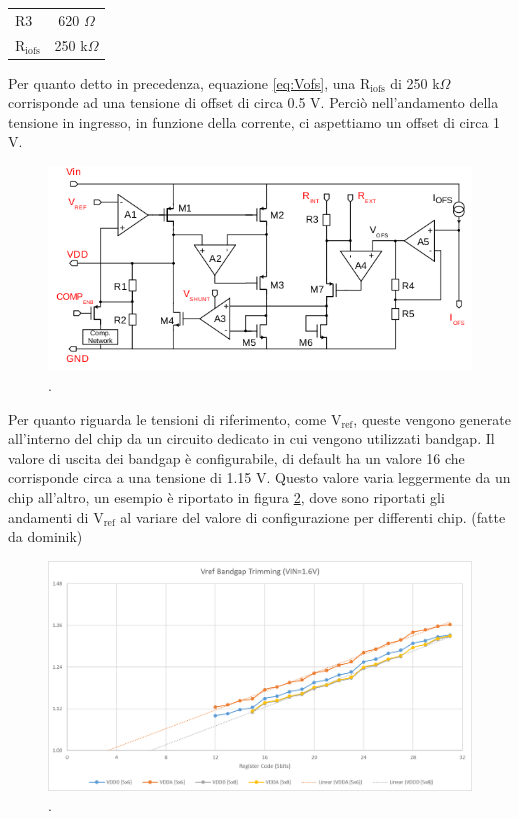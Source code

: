 \begin{center}
\begin{tabular}{lc}
\hline
$\mathrm{R3}$ & 620 $\Omega$ \\
$\mathrm{R_{iofs}}$ & 250 k$\Omega$\\ 
\hline
\end{tabular}
\end{center}
Per quanto detto in precedenza, equazione \ref{eq:Vofs}, una $\mathrm{R_{iofs}}$ di 250 k$\Omega$ corrisponde ad una tensione di offset di circa 0.5 V. Perciò nell'andamento della tensione in ingresso, in funzione della corrente, ci aspettiamo un offset di circa 1 V.
\begin{figure}
\centering
\includegraphics[scale=.6]{Immagini/SLDO_RD53A}
\caption{.}
\label{SLDO_RD53A}
\end{figure}

Per quanto riguarda le tensioni di riferimento, come $\mathrm{V_{ref}}$, queste vengono generate all'interno del chip da un circuito dedicato in cui vengono utilizzati bandgap. Il valore di uscita dei bandgap è configurabile, di default ha un valore 16 che corrisponde circa a una tensione di 1.15 V. 
Questo valore varia leggermente da un chip all'altro, un esempio è riportato in figura \ref{bandgap_trimming}, dove sono riportati gli andamenti di $\mathrm{V_{ref}}$ al variare del valore di configurazione per differenti chip. (fatte da dominik)

\begin{figure}
\centering
\includegraphics[scale=.5]{Immagini/bandgap_trimming}
\caption{.}
\label{bandgap_trimming}
\end{figure}


